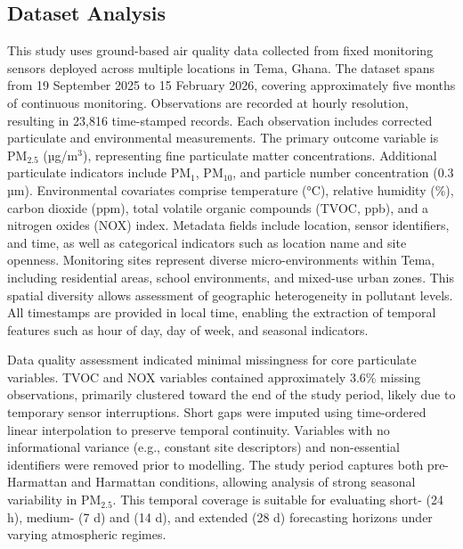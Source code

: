 \documentclass[a4paper,fleqn]{cas-sc}
\begin{document}
\subsection{Dataset Analysis}
This study uses ground-based air quality data collected from fixed monitoring sensors deployed across multiple locations in Tema, Ghana. The dataset spans from 19 September 2025 to 15 February 2026, covering approximately five months of continuous monitoring. Observations are recorded at hourly resolution, resulting in 23,816 time-stamped records. Each observation includes corrected particulate and environmental measurements. The primary outcome variable is PM$_{2.5}$ (µg/m$^3$), representing fine particulate matter concentrations. Additional particulate indicators include PM$_{1}$, PM$_{10}$, and particle number concentration (0.3 µm). Environmental covariates comprise temperature (°C), relative humidity (\%), carbon dioxide (ppm), total volatile organic compounds (TVOC, ppb), and a nitrogen oxides (NOX) index. Metadata fields include location, sensor identifiers, and time, as well as categorical indicators such as location name and site openness.
Monitoring sites represent diverse micro-environments within Tema, including residential areas, school environments, and mixed-use urban zones. This spatial diversity allows assessment of geographic heterogeneity in pollutant levels. All timestamps are provided in local time, enabling the extraction of temporal features such as hour of day, day of week, and seasonal indicators.

Data quality assessment indicated minimal missingness for core particulate variables. TVOC and NOX variables contained approximately 3.6\% missing observations, primarily clustered toward the end of the study period, likely due to temporary sensor interruptions. Short gaps were imputed using time-ordered linear interpolation to preserve temporal continuity. Variables with no informational variance (e.g., constant site descriptors) and non-essential identifiers were removed prior to modelling.
The study period captures both pre-Harmattan and Harmattan conditions, allowing analysis of strong seasonal variability in PM$_{2.5}$. This temporal coverage is suitable for evaluating short- (24 h), medium- (7 d) and (14 d), and extended (28 d) forecasting horizons under varying atmospheric regimes.
\end{document}
